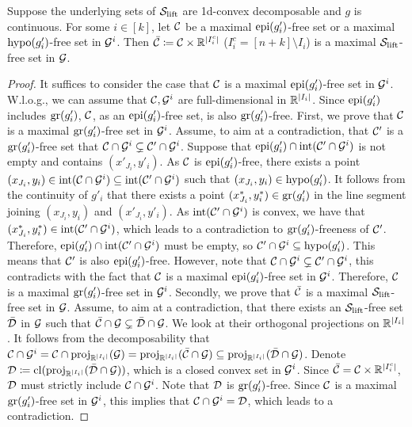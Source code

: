 \begin{theorem}
\label{thm.decomp}
Suppose the underlying sets of $\mathcal S_{\mathrm{lift}}$ are 1d-convex decomposable and $g$ is continuous. For some $i \in [k]$, let $\mathcal C$ be a maximal $\operatorname{epi}(g'_i)$-free set or a maximal $\operatorname{hypo}(g'_i)$-free set in $\mathcal G^i$. Then $\bar{\mathcal C}\coloneqq \mathcal C \times \mathbb R^{|I^c_i|}$ ($I^c_i = [n+k] \setminus I_i$) is a maximal $\mathcal S_{\mathrm{lift}}$-free set in $\mathcal G$.
\end{theorem}
\begin{proof}
It suffices to consider the case that $\mathcal C$ is a maximal $\operatorname{epi}(g'_i)$-free set in $\mathcal G^i$. W.l.o.g., we can assume that $\mathcal C,  \mathcal G^i$ are full-dimensional in $\mathbb R^{|I_i|}$. Since $\operatorname{epi}(g'_i)$ includes $\operatorname{gr}(g'_i)$, $\mathcal C$, as an $\operatorname{epi}(g'_i)$-free set,  is also $\operatorname{gr}(g'_i)$-free. First, we prove that  $\mathcal C$ is a maximal $\operatorname{gr}(g'_i)$-free set in $\mathcal G^i$. Assume, to aim at a contradiction, that $\mathcal C'$ is a $\operatorname{gr}(g'_i)$-free set that $\mathcal C \cap \mathcal G^i \subsetneq \mathcal C' \cap \mathcal G^i$.  Suppose that $\operatorname{epi}(g'_i)  \cap \operatorname{int}(\mathcal C' \cap \mathcal G^i)$ is not empty and contains $(x'_{J_i}, y'_i)$.     As $\mathcal C$ is  $\operatorname{epi}(g'_i)$-free, there exists a point $(x_{J_i}, y_i) \in \operatorname{int}(\mathcal C \cap \mathcal G^i) \subseteq \operatorname{int}(\mathcal C' \cap \mathcal G^i)$ such that $(x_{J_i}, y_i) \in \operatorname{hypo}(g'_i)$.  It follows from the continuity of $g'_i$  that there exists a point $(x^\ast_{J_i}, y^\ast_i) \in \operatorname{gr}(g'_i)$ in the line segment joining $(x_{J_i}, y_i)$ and $(x'_{J_i}, y'_i) $. As $\operatorname{int}(\mathcal C' \cap \mathcal G^i)$ is convex,  we have that $(x^\ast_{J_i}, y^\ast_i) \in \operatorname{int}(\mathcal C' \cap \mathcal G^i)$, which leads to a contradiction to $\operatorname{gr}(g'_i)$-freeness of $\mathcal C'$. Therefore, $\operatorname{epi}(g'_i)  \cap \operatorname{int}(\mathcal C' \cap \mathcal G^i)$ must be empty, so $\mathcal C' \cap \mathcal G^i  \subseteq \operatorname{hypo}(g'_i)$. This means that $\mathcal C'$ is also $\operatorname{epi}(g'_i)$-free. However, note that  $\mathcal C \cap \mathcal G^i \subsetneq \mathcal C' \cap \mathcal G^i$, this contradicts with the fact that $\mathcal C$ is a maximal $\operatorname{epi}(g'_i)$-free set in $\mathcal G^i$. Therefore, $\mathcal C$  is a maximal $\operatorname{gr}(g'_i)$-free set in $\mathcal G^i$. Secondly, we  prove that $\bar{\mathcal C}$ is a maximal $\mathcal S_{\mathrm{lift}}$-free set in $\mathcal G$.
Assume, to aim at a contradiction, that there exists an $\mathcal S_{\mathrm{lift}}$-free set $\bar{\mathcal D}$ in $\mathcal G$ such that $ \bar{\mathcal C} \cap \mathcal G \subsetneq \bar{\mathcal D} \cap \mathcal G$. We look at their orthogonal projections on  $\mathbb R^{|I_i|}$. It follows from the decomposability  that $\mathcal C \cap \mathcal G^i = \mathcal C \cap \operatorname{proj}_{\mathbb R^{|I_i|}} (\mathcal G) = \operatorname{proj}_{\mathbb R^{|I_i|}}(\bar{\mathcal C} \cap \mathcal G) \subseteq \operatorname{proj}_{\mathbb R^{|I_i|}}(\bar{\mathcal D} \cap \mathcal G)$. Denote $\mathcal D \coloneqq \operatorname{cl}(\operatorname{proj}_{\mathbb R^{|I_i|}}(\bar{\mathcal D} \cap \mathcal G))$, which is a closed convex set in $\mathcal G^i$. Since $\bar{\mathcal C}= \mathcal C \times \mathbb R^{|I^c_i|}$, $\mathcal D$  must strictly include $\mathcal C \cap \mathcal G^i$. Note that $\mathcal D$ is $\operatorname{gr}(g'_i)$-free. Since $\mathcal C$ is a maximal $\operatorname{gr}(g'_i)$-free set in $\mathcal G^i$, this implies that $\mathcal C \cap \mathcal G^i = \mathcal D$, which leads to a contradiction.
\end{proof}

